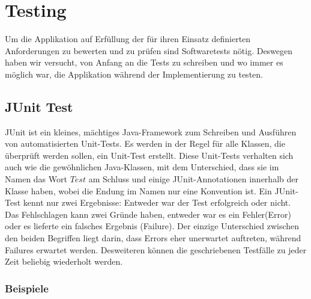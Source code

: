 \section{Testing}
Um die Applikation auf Erfüllung der für ihren Einsatz definierten Anforderungen zu bewerten und zu prüfen sind Softwaretests nötig. Deswegen haben wir versucht, von Anfang an die Tests zu schreiben und wo immer es möglich war, die Applikation während der Implementierung zu testen. 

\subsection{JUnit Test}
JUnit ist ein kleines, mächtiges Java-Framework zum Schreiben und Ausführen von automatisierten Unit-Tests. Es werden in der Regel für alle Klassen, die überprüft werden sollen, ein Unit-Test erstellt. Diese Unit-Tests verhalten sich auch wie die gewöhnlichen Java-Klassen, mit dem Unterschied, dass sie im Namen das Wort $Test$ am Schluss und einige JUnit-Annotationen innerhalb der Klasse haben, wobei die Endung im Namen nur eine Konvention ist. Ein JUnit-Test kennt nur zwei Ergebnisse: Entweder war der Test erfolgreich oder nicht. Das Fehlschlagen kann zwei Gründe haben, entweder war es ein Fehler(Error) oder es lieferte ein falsches Ergebnis (Failure). Der einzige Unterschied zwischen den beiden Begriffen liegt darin, dass Errors eher unerwartet auftreten, während Failures erwartet werden. Desweiteren können die geschriebenen Testfälle zu jeder Zeit beliebig wiederholt werden. 

\subsubsection{Beispiele}
